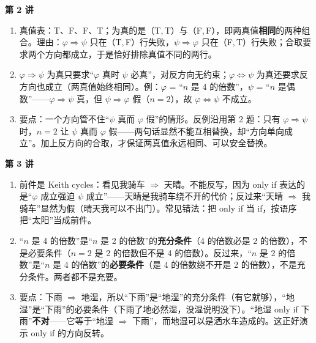 \documentclass[UTF8,a4paper,11pt]{ctexart}
\begin{document}
\textbf{第 2 讲}
\begin{enumerate}
  \item 真值表：T、F、F、T；为真的是（T,\,T）与（F,\,F），即两真值\textbf{相同}的两种组合。理由：$\varphi \Rightarrow \psi$ 只在（T,\,F）行失败，$\psi \Rightarrow \varphi$ 只在（F,\,T）行失败；合取要求两个方向都成立，于是恰好排除真值不同的两行。
  \item $\varphi \Rightarrow \psi$ 为真只要求“$\varphi$ 真时 $\psi$ 必真”，对反方向无约束；$\varphi \Leftrightarrow \psi$ 为真还要求反方向也成立（两真值始终相同）。例：$\varphi$ = “$n$ 是 4 的倍数”，$\psi$ = “$n$ 是偶数”——$\varphi \Rightarrow \psi$ 真，但 $\psi \Rightarrow \varphi$ 假（$n = 2$），故 $\varphi \Leftrightarrow \psi$ 不成立。
  \item 要点：一个方向管不住“$\psi$ 真而 $\varphi$ 假”的情形。反例沿用第 2 题：只有 $\varphi \Rightarrow \psi$ 时，$n = 2$ 让 $\psi$ 真而 $\varphi$ 假——两句话显然不能互相替换，却“方向单向成立”。加上反方向的合取，才保证两真值永远相同、可以安全替换。
\end{enumerate}

\textbf{第 3 讲}
\begin{enumerate}
  \item 前件是 Keith cycles：看见我骑车 $\Rightarrow$ 天晴。不能反写，因为 only if 表达的是“$\varphi$ 成立强迫 $\psi$ 成立”——天晴是我骑车绕不开的代价；反过来“天晴 $\Rightarrow$ 我骑车”显然为假（晴天我可以不出门）。常见错法：把 only if 当 if，按语序把“太阳”当成前件。
  \item “$n$ 是 4 的倍数”是“$n$ 是 2 的倍数”的\textbf{充分条件}（4 的倍数必是 2 的倍数），不是必要条件（$n=2$ 是 2 的倍数但不是 4 的倍数）。反过来，“$n$ 是 2 的倍数”是“$n$ 是 4 的倍数”的\textbf{必要条件}（是 4 的倍数绕不开是 2 的倍数），不是充分条件。两者都不是充要。
  \item 要点：下雨 $\Rightarrow$ 地湿，所以“下雨”是“地湿”的充分条件（有它就够），“地湿”是“下雨”的必要条件（下雨了地必然湿，没湿说明没下）。“地湿 only if 下雨”\textbf{不对}——它等于“地湿 $\Rightarrow$ 下雨”，而地湿可以是洒水车造成的。这正好演示 only if 的方向反转。
\end{enumerate}
\end{document}
